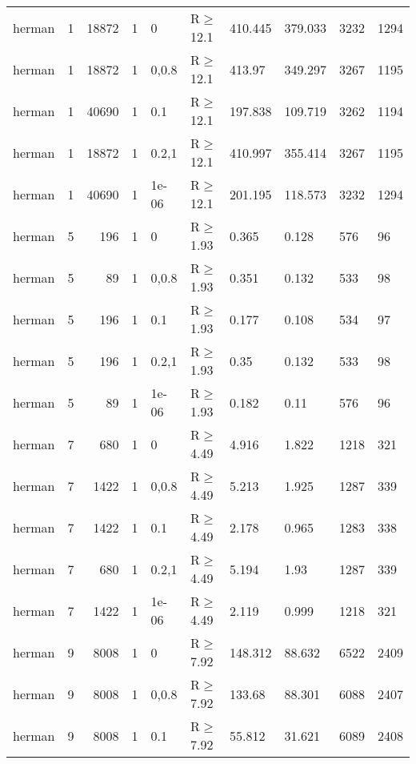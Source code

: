 \begin{longtable}{llrrllllll}
 herman        & 1         &  	18872 &   1 & 0     & R$\geq$12.1  & 410.445  & 379.033  & 3232    & 1294    \\
 herman        & 1         &  	18872 &   1 & 0,0.8 & R$\geq$12.1  & 413.97   & 349.297  & 3267    & 1195    \\
 herman        & 1         &  	40690 &   1 & 0.1   & R$\geq$12.1  & 197.838  & 109.719  & 3262    & 1194    \\
 herman        & 1         &  	18872 &   1 & 0.2,1 & R$\geq$12.1  & 410.997  & 355.414  & 3267    & 1195    \\
 herman        & 1         &  	40690 &   1 & 1e-06 & R$\geq$12.1  & 201.195  & 118.573  & 3232    & 1294    \\
 herman        & 5         &    	196 &   1 & 0     & R$\geq$1.93  & 0.365    & 0.128    & 576     & 96      \\
 herman        & 5         &     	89 &   1 & 0,0.8 & R$\geq$1.93  & 0.351    & 0.132    & 533     & 98      \\
 herman        & 5         &    	196 &   1 & 0.1   & R$\geq$1.93  & 0.177    & 0.108    & 534     & 97      \\
 herman        & 5         &    	196 &   1 & 0.2,1 & R$\geq$1.93  & 0.35     & 0.132    & 533     & 98      \\
 herman        & 5         &     	89 &   1 & 1e-06 & R$\geq$1.93  & 0.182    & 0.11     & 576     & 96      \\
 herman        & 7         &    	680 &   1 & 0     & R$\geq$4.49  & 4.916    & 1.822    & 1218    & 321     \\
 herman        & 7         &   	1422 &   1 & 0,0.8 & R$\geq$4.49  & 5.213    & 1.925    & 1287    & 339     \\
 herman        & 7         &   	1422 &   1 & 0.1   & R$\geq$4.49  & 2.178    & 0.965    & 1283    & 338     \\
 herman        & 7         &    	680 &   1 & 0.2,1 & R$\geq$4.49  & 5.194    & 1.93     & 1287    & 339     \\
 herman        & 7         &   	1422 &   1 & 1e-06 & R$\geq$4.49  & 2.119    & 0.999    & 1218    & 321     \\
 herman        & 9         &   	8008 &   1 & 0     & R$\geq$7.92  & 148.312  & 88.632   & 6522    & 2409    \\
 herman        & 9         &   	8008 &   1 & 0,0.8 & R$\geq$7.92  & 133.68   & 88.301   & 6088    & 2407    \\
 herman        & 9         &   	8008 &   1 & 0.1   & R$\geq$7.92  & 55.812   & 31.621   & 6089    & 2408    \\

\end{longtable}
